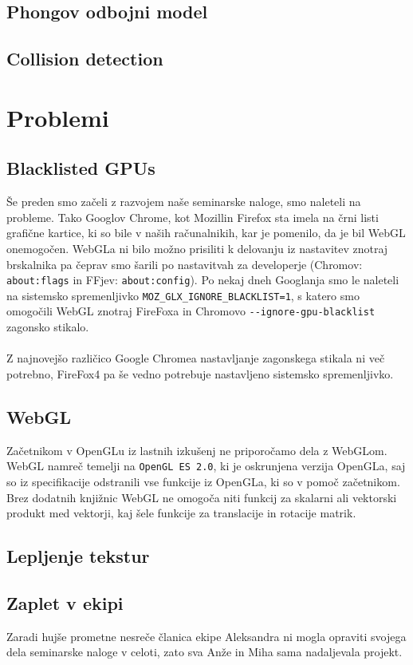 \documentclass[10pt,a4paper]{article}
\begin{document}
\subsection{Phongov odbojni model}
\subsection{Collision detection}
\pagebreak
\section{Problemi}
\subsection{Blacklisted GPUs}
Še preden smo začeli z razvojem naše seminarske naloge, smo naleteli na probleme.
Tako Googlov Chrome, kot Mozillin Firefox sta imela na črni listi grafične kartice,
ki so bile v naših računalnikih, kar je pomenilo, da je bil WebGL onemogočen. 
WebGLa ni bilo možno prisiliti k delovanju iz nastavitev znotraj brskalnika pa 
čeprav smo šarili po nastavitvah za developerje (Chromov: \verb|about:flags| in FFjev: \verb|about:config|).
Po nekaj dneh Googlanja smo le naleteli na sistemsko spremenljivko \verb|MOZ_GLX_IGNORE_BLACKLIST=1|,
s katero smo omogočili WebGL znotraj FireFoxa in Chromovo \verb|--ignore-gpu-blacklist| zagonsko stikalo.\\\\
Z najnovejšo različico Google Chromea nastavljanje zagonskega stikala ni več potrebno, 
FireFox4 pa še vedno potrebuje nastavljeno sistemsko spremenljivko.
\subsection{WebGL}
Začetnikom v OpenGLu iz lastnih izkušenj ne priporočamo dela z WebGLom. WebGL namreč temelji
na \verb|OpenGL ES 2.0|, ki je oskrunjena verzija OpenGLa, saj so iz specifikacije odstranili
vse funkcije iz OpenGLa, ki so v pomoč začetnikom. Brez dodatnih knjižnic WebGL ne
omogoča niti funkcij za skalarni ali vektorski produkt med vektorji, kaj šele funkcije
za translacije in rotacije matrik.
\subsection{Lepljenje tekstur}
\subsection{Zaplet v ekipi}
Zaradi hujše prometne nesreče članica ekipe Aleksandra ni mogla opraviti svojega dela 
seminarske naloge v celoti, zato sva Anže in Miha sama nadaljevala projekt. 
\pagebreak
\end{document}

